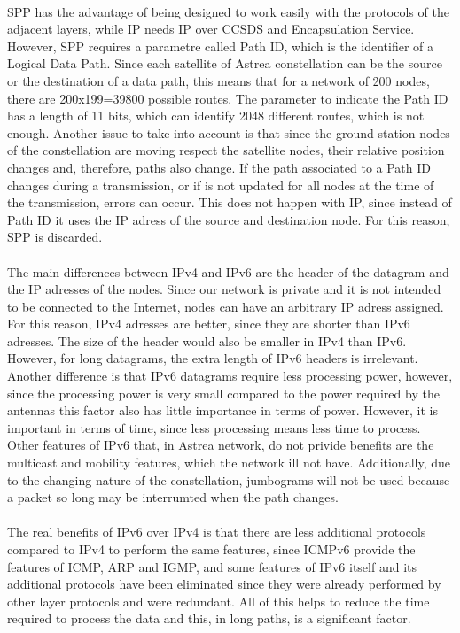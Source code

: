 \begin{itemize}
\paragraph{}SPP has the advantage of being designed to work easily with the protocols of the adjacent layers, while IP needs IP over CCSDS and Encapsulation Service. However, SPP requires a parametre called Path ID, which is the identifier of a Logical Data Path. Since each satellite of Astrea constellation can be the source or the destination of a data path, this means that for a network of 200 nodes, there are 200x199=39800 possible routes. The parameter to indicate the Path ID has a length of 11 bits, which can identify 2048 different routes, which is not enough. Another issue to take into account is that since the ground station nodes of the constellation are moving respect the satellite nodes, their relative position changes and, therefore, paths also change. If the path associated to a Path ID changes during a transmission, or if is not updated for all nodes at the time of the transmission, errors can occur. This does not happen with IP, since instead of Path ID it uses the IP adress of the source and destination node. For this reason, SPP is discarded.
\paragraph{}The main differences between IPv4 and IPv6 are the header of the datagram and the IP adresses of the nodes. Since our  network is private and it is not intended to be connected to the Internet, nodes can have an arbitrary IP adress assigned. For this reason, IPv4 adresses are better, since they are shorter than IPv6 adresses. The size of the header would also be smaller in IPv4 than IPv6. However, for long datagrams, the extra length of IPv6 headers is irrelevant. Another difference is that IPv6 datagrams require less processing power, however, since the processing power is very small compared to the power required by the antennas this factor also has little importance in terms of power. However, it is important in terms of time, since less processing means less time to process. Other features of IPv6 that, in Astrea network, do not privide benefits are the multicast and mobility features, which the network ill not have. Additionally, due to the changing nature of the constellation, jumbograms will not be used because a packet so long may be interrumted when the path changes.
\paragraph{}The real benefits of IPv6 over IPv4 is that there are less additional protocols compared to IPv4 to perform the same features, since ICMPv6 provide the features of ICMP, ARP and IGMP, and some features of IPv6 itself and its additional protocols have been eliminated since they were already performed by other layer protocols and were redundant. All of this helps to reduce the time required to process the data and this, in long paths, is a significant factor.

\end{itemize}
